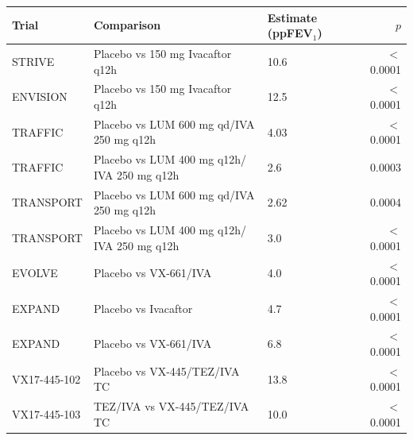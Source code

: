 \begin{tabular}{lllr}
\toprule
Trial & Comparison & Estimate (ppFEV$_1$) & $p$ \\
\midrule
STRIVE & Placebo vs 150 mg Ivacaftor q12h & 10.6 & $<$0.0001 \\
ENVISION & Placebo vs 150 mg Ivacaftor q12h & 12.5 & $<$0.0001 \\
TRAFFIC & Placebo vs LUM 600 mg qd/IVA 250 mg q12h & 4.03 & $<$0.0001 \\
TRAFFIC & Placebo vs LUM 400 mg q12h/ IVA 250 mg q12h & 2.6 & 0.0003 \\
TRANSPORT & Placebo vs LUM 600 mg qd/IVA 250 mg q12h & 2.62 & 0.0004 \\
TRANSPORT & Placebo vs LUM 400 mg q12h/ IVA 250 mg q12h & 3.0 & $<$0.0001 \\
EVOLVE & Placebo vs VX-661/IVA & 4.0 & $<$0.0001 \\
EXPAND & Placebo vs Ivacaftor & 4.7 & $<$ 0.0001 \\
EXPAND & Placebo vs VX-661/IVA & 6.8 & $<$ 0.0001 \\
VX17-445-102 & Placebo vs VX-445/TEZ/IVA TC & 13.8 & $<$0.0001 \\
VX17-445-103 & TEZ/IVA vs VX-445/TEZ/IVA TC & 10.0 & $<$0.0001 \\
\bottomrule
\end{tabular}
